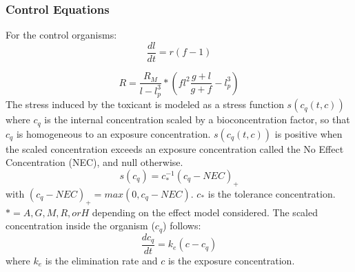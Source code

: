 \documentclass[
]{article}
\begin{document}
\hypertarget{control-equations}{%
\subsubsection{Control Equations}\label{control-equations}}

For the control organisms: \[\frac{dl}{dt} = r(f-1)\]

\[ R = \frac{R_M}{l-l^3_{p}} * (fl^2 \frac{g+l}{g+f} - l^3_{p})\] The
stress induced by the toxicant is modeled as a stress function
\(s(c_q(t,c))\) where \(c_q\) is the internal concentration scaled by a
bioconcentration factor, so that \(c_q\) is homogeneous to an exposure
concentration. \(s(c_q(t,c))\) is positive when the scaled concentration
exceeds an exposure concentration called the No Effect Concentration
(NEC), and null otherwise. \[s(c_q) = c^{-1}_*(c_q - NEC)_+\] with
\((c_q-NEC)_+ = max(0, c_q-NEC)\). \(c_*\) is the tolerance
concentration. \(* = A, G, M, R, or H\) depending on the effect model
considered. The scaled concentration inside the organism (\(c_q\))
follows: \[\frac{dc_q}{dt} = k_e(c-c_q) \] where \(k_e\) is the
elimination rate and \(c\) is the exposure concentration.
\end{document}
